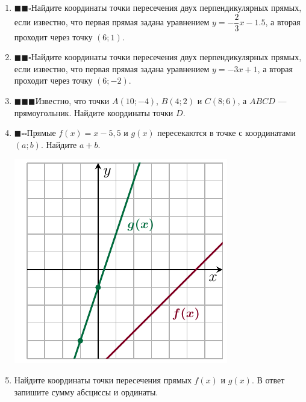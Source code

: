 \documentclass[10pt, a4paper]{article}
\newcommand{\ranswer}[1]{\textcolor{silver}{\begin{flushright}\vspace{-1em}\fbox{#1}\end{flushright}}}
\newcommand{\leveli}{\textcolor{dark}{$\blacksquare\square\square$}\hspace{0.5em}}
\newcommand{\levelii}{\textcolor{dark}{$\blacksquare\blacksquare\square$}\hspace{0.5em}}
\newcommand{\leveliii}{\textcolor{dark}{$\blacksquare\blacksquare\blacksquare$}\hspace{0.5em}}
\begin{document}
\begin{enumerate}
	\item \levelii Найдите координаты точки пересечения двух перпендикулярных прямых, если известно, что первая прямая задана уравнением $y=-\dfrac{2}{3}x-1.5$, а вторая проходит через точку $(6;1)$. \ranswer{$(3;-3,5)$}
	\item \levelii Найдите координаты точки пересечения двух перпендикулярных прямых, если известно, что первая прямая задана уравнением $y=-3x+1$, а вторая проходит через точку $(6;-2)$. \ranswer{$(1,5;-3,5)$}
	\item \leveliii Известно, что точки $A(10;-4)$, $B(4;2)$ и $C(8;6)$, а $ABCD$ --- прямоугольник. Найдите координаты точки $D$. \ranswer{$(14;0)$}
	\item
	\begin{minipage}[t]{0.6\textwidth}
		\leveli Прямые $f(x)=x-5,5$ и $g(x)$ пересекаются в точке с координатами $(a;b)$. Найдите $a+b$. \ranswer{$-10$}
	\end{minipage}
	\begin{minipage}[t]{0.3\textwidth}
		\includegraphics[align=t, width=\textwidth]{../graphs/graph_6/graph_6}
	\end{minipage}
	\item
	\begin{minipage}[t]{0.6\textwidth}
		Найдите координаты точки пересечения прямых $f(x)$ и $g(x)$. В ответ запишите сумму абсциссы и ординаты. \ranswer{$3,75$}

\end{minipage}
\end{enumerate}
\end{document}
